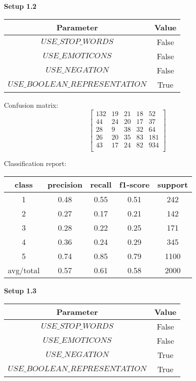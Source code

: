 \documentclass[12pt]{report}
\begin{document}
\textbf{Setup 1.2}

\begin{center}
	\begin{tabular}{ c | c }
		\hline
		Parameter & Value \\ \hline
		$USE\_STOP\_WORDS$ & False \\ \hline
		$USE\_EMOTICONS$ & False \\ \hline
		$USE\_NEGATION$ & False \\ \hline
		$USE\_BOOLEAN\_REPRESENTATION$ & True \\ \hline
	\end{tabular}
\end{center}

Confusion matrix:
\[
\begin{bmatrix}
132 & 19 & 21 & 18 & 52 \\
44 & 24 & 20 & 17 & 37 \\
28 &  9 & 38 & 32 & 64 \\
26 & 20 & 35 & 83 & 181 \\
43 & 17 & 24 & 82 & 934 \\
\end{bmatrix}
\]

Classification report:

\begin{center}
	\begin{tabular}{c | c | c | c | c }
		\hline
		class & precision & recall & f1-score & support \\ \hline
		1 & 0.48 & 0.55 & 0.51 & 242 \\ \hline
		2 & 0.27 & 0.17 & 0.21 & 142 \\ \hline
		3 & 0.28 & 0.22 & 0.25 & 171 \\ \hline
		4 & 0.36 & 0.24 & 0.29 & 345 \\ \hline
		5 & 0.74 & 0.85 & 0.79 & 1100 \\ \hline
		avg/total & 0.57 & 0.61 & 0.58 & 2000 \\ \hline
	\end{tabular}
\end{center}


\textbf{Setup 1.3}

\begin{center}
	\begin{tabular}{ c | c }
		\hline
		Parameter & Value \\ \hline
		$USE\_STOP\_WORDS$ & False \\ \hline
		$USE\_EMOTICONS$ & False \\ \hline
		$USE\_NEGATION$ & True \\ \hline
		$USE\_BOOLEAN\_REPRESENTATION$ & True \\ \hline
	\end{tabular}
\end{center}
\end{document}
